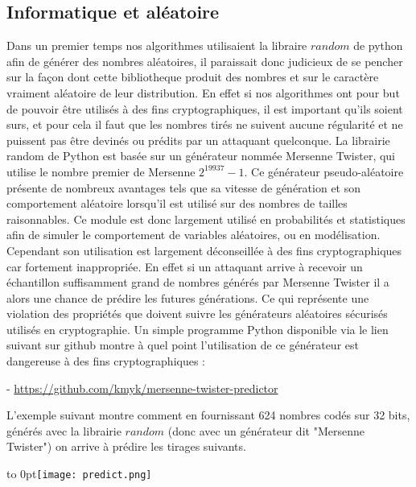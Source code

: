 \documentclass[a4paper,11pt]{article}
\begin{document}
\subsection{Informatique et aléatoire}
Dans un premier temps nos algorithmes utilisaient la libraire $random$ de python afin de générer des nombres aléatoires, il paraissait donc judicieux de se pencher sur la façon dont cette bibliotheque produit des nombres et sur le caractère vraiment aléatoire de leur distribution.
En effet si nos algorithmes ont pour but de pouvoir être utilisés à des fins cryptographiques, il est important qu'ils soient surs, et pour cela il faut que les nombres tirés ne suivent aucune régularité et ne puissent pas être devinés ou prédits par un attaquant quelconque. 
\newline 
La librairie random de Python est basée sur un générateur nommée Mersenne Twister, qui utilise le nombre premier de Mersenne $2^{19937} - 1$. Ce générateur pseudo-aléatoire présente de nombreux avantages tels que sa vitesse de génération et son comportement aléatoire lorsqu'il est utilisé sur des nombres de tailles raisonnables. Ce module est donc largement utilisé en probabilités et statistiques afin de simuler le comportement de variables aléatoires, ou en modélisation. Cependant son utilisation est largement déconseillée à des fins cryptographiques car fortement inappropriée. En effet si un attaquant arrive à recevoir un échantillon suffisamment grand de nombres générés par Mersenne Twister il a alors une chance de prédire les futures générations. Ce qui représente une violation des propriétés que doivent suivre les générateurs aléatoires sécurisés utilisés en cryptographie. Un simple programme Python disponible via le lien suivant sur github montre à quel point l'utilisation de ce générateur est dangereuse à des fins cryptographiques : \newline
 
\smallbreak - \url{ https://github.com/kmyk/mersenne-twister-predictor}
\smallbreak


L'exemple suivant montre comment en  fournissant 624 nombres codés sur 32 bits, générés avec la librairie $random$ (donc avec un générateur dit "Mersenne Twister") on arrive à prédire les tirages suivants. 


 
\hfill\hbox to 0pt{\hss\texttt{[image: predict.png]}\hss}\hfill\null
\medbreak
\end{document}
